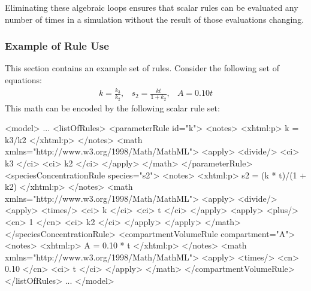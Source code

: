 \documentclass[10pt,twocolumntoc]{cekarticle}
\newcommand{\D}{\displaystyle}
\begin{document}
Eliminating these algebraic loops ensures that scalar rules can be
evaluated any number of times in a simulation without the result of those
evaluations changing.


\subsubsection{Example of Rule Use}
\label{sec:eg-rule-use}

This section contains an example set of rules.  Consider the following
set of equations:
\begin{equation*}
  \begin{array}{lll}
    k = \D\frac{k_3}{k_2}, & s_2 = \D\frac{k t}{1 + k_2}, & A = 0.10 t
  \end{array}
\end{equation*}
This math can be encoded by the following scalar rule set:
\begin{example}
<model>
    ...
    <listOfRules>
        <parameterRule id="k">
            <notes>
                <xhtml:p>
                    k = k3/k2
                </xhtml:p>
            </notes>
            <math xmlns="http://www.w3.org/1998/Math/MathML">
                <apply>
                    <divide/>
                    <ci> k3 </ci>
                    <ci> k2 </ci>
                </apply>
            </math>
        </parameterRule>
        <speciesConcentrationRule species="s2">
            <notes>
                <xhtml:p>
                    s2 = (k * t)/(1 + k2)
                </xhtml:p>
            </notes>
            <math xmlns="http://www.w3.org/1998/Math/MathML">
                <apply>
                    <divide/>
                    <apply>
                        <times/>
                        <ci> k </ci>
                        <ci> t </ci>
                    </apply>
                    <apply>
                        <plus/>
                        <cn> 1 </cn>
                        <ci> k2 </ci>
                    </apply>
                </apply>
            </math>
        </speciesConcentrationRule>
        <compartmentVolumeRule compartment="A">
            <notes>
                <xhtml:p>
                    A = 0.10 * t
                </xhtml:p>
            </notes>
            <math xmlns="http://www.w3.org/1998/Math/MathML">
                <apply>
                    <times/>
                    <cn> 0.10 </cn>
                    <ci> t </ci>
                </apply>
            </math>
        </compartmentVolumeRule>
    </listOfRules>
    ...
</model>
\end{example}
\end{document}
